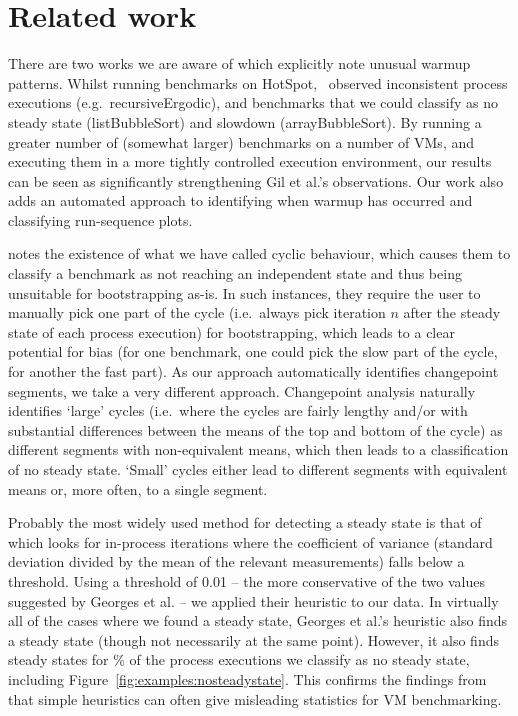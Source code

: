 \documentclass[acmsmall]{acmart}\settopmatter{printfolios=true}
\begin{document}
\section{Related work}
\label{sec:related}

There are two works we are aware of which explicitly note unusual warmup
patterns. Whilst running benchmarks on HotSpot,~\citet{gil11microbenchmark}
observed inconsistent process executions
(e.g.~recursiveErgodic), and benchmarks that we could classify as no
steady state (listBubbleSort) and slowdown (arrayBubbleSort). By running a
greater number of (somewhat larger) benchmarks on a number of VMs, and executing
them in a more tightly controlled execution environment, our results can be seen
as significantly strengthening Gil et al.'s observations. Our work also adds an
automated approach to identifying when warmup has occurred and classifying
run-sequence plots.

\cite{kalibera13rigorous} notes the existence of what we have called cyclic behaviour, which
causes them to classify a benchmark as not reaching an independent state and
thus being unsuitable for bootstrapping as-is. In such instances, they require
the user to manually pick one part of the cycle (i.e.~always pick iteration $n$
after the steady state of each process execution) for bootstrapping, which leads
to a clear potential for bias (for one benchmark, one could pick the slow part
of the cycle, for another the fast part). As our approach automatically
identifies changepoint segments, we take a very different approach. Changepoint
analysis naturally identifies `large' cycles (i.e.~where the cycles are fairly
lengthy and/or with substantial differences between the means of the top and
bottom of the cycle) as different segments with non-equivalent means, which then
leads to a classification of no steady state. `Small' cycles either lead to
different segments with equivalent means or, more often, to a single segment.

Probably the most widely used method for detecting a steady state is that of
\citet{georges07statistically} which looks for in-process iterations where the
coefficient of variance (standard deviation divided by the mean of the relevant measurements)
falls below a threshold. Using a threshold of 0.01 -- the more
conservative of the two values suggested by Georges et al. -- we applied their
heuristic to our data. In virtually all of the cases where we found a steady
state, Georges et al.'s heuristic also finds a steady state (though not
necessarily at the same point). However, it also
finds steady states for \georgesnosteadystatepercent\% of the process executions we classify as no
steady state, including Figure~\ref{fig:examples:nosteadystate}. This confirms
the findings from \cite{kalibera13rigorous} that simple heuristics can often
give misleading statistics for VM benchmarking.
\end{document}
